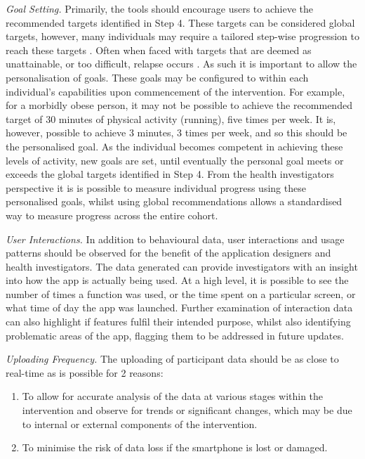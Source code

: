 \textit{Goal Setting.} Primarily, the tools should encourage users to achieve the recommended targets identified in Step 4. These targets can be considered global targets, however, many individuals may require a tailored step-wise progression to reach these targets \cite{Prochaska2013}. Often when faced with targets that are deemed as unattainable, or too difficult, relapse occurs \cite{Velicer1995, Prochaska2005}. As such it is important to allow the personalisation of goals. These goals may be configured to within each individual's capabilities upon commencement of the intervention. For example, for a morbidly obese person, it may not be possible to achieve the recommended target of 30 minutes of physical activity (running), five times per week. It is, however, possible to achieve 3 minutes, 3 times per week, and so this should be the personalised goal. As the individual becomes competent in achieving these levels of activity, new goals are set, until eventually the personal goal meets or exceeds the global targets identified in Step 4.
From the health investigators perspective it is is possible to measure individual progress using these personalised goals, whilst using global recommendations allows a standardised way to measure progress across the entire cohort.

\textit{User Interactions.} In addition to behavioural data, user interactions and usage patterns should be observed for the benefit of the application designers and health investigators. The data generated can provide investigators with an insight into how the app is actually being used. At a high level, it is possible to see the number of times a function was used, or the time spent on a particular screen, or what time of day the app was launched. Further examination of interaction data can also highlight if features fulfil their intended purpose, whilst also identifying problematic areas of the app, flagging them to be addressed in future updates.

\textit{Uploading Frequency.} The uploading of participant data should be as close to real-time as is possible for 2 reasons:
\begin{enumerate}[noitemsep,topsep=0pt]
\item To allow for accurate analysis of the data at various stages within the intervention and observe for trends or significant changes, which may be due to internal or external components of the intervention.
\item To minimise the risk of data loss if the smartphone is lost or damaged.
\end{enumerate}

